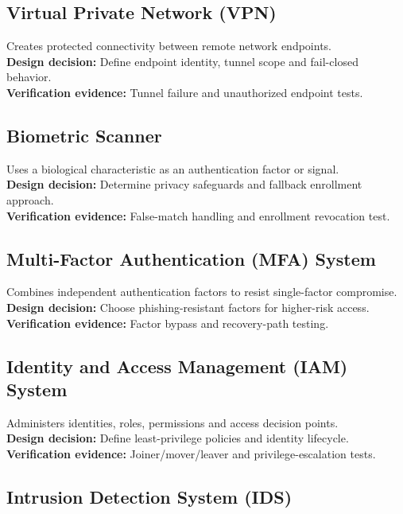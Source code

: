 \documentclass[10pt,letterpaper]{article}
\begin{document}
\subsection{Virtual Private Network (VPN)}
Creates protected connectivity between remote network endpoints.\\[4pt]
\textbf{Design decision:} Define endpoint identity, tunnel scope and fail-closed behavior.\\[3pt]
\textbf{Verification evidence:} Tunnel failure and unauthorized endpoint tests.\\[3pt]
\subsection{Biometric Scanner}
Uses a biological characteristic as an authentication factor or signal.\\[4pt]
\textbf{Design decision:} Determine privacy safeguards and fallback enrollment approach.\\[3pt]
\textbf{Verification evidence:} False-match handling and enrollment revocation test.\\[3pt]
\subsection{Multi-Factor Authentication (MFA) System}
Combines independent authentication factors to resist single-factor compromise.\\[4pt]
\textbf{Design decision:} Choose phishing-resistant factors for higher-risk access.\\[3pt]
\textbf{Verification evidence:} Factor bypass and recovery-path testing.\\[3pt]
\subsection{Identity and Access Management (IAM) System}
Administers identities, roles, permissions and access decision points.\\[4pt]
\textbf{Design decision:} Define least-privilege policies and identity lifecycle.\\[3pt]
\textbf{Verification evidence:} Joiner/mover/leaver and privilege-escalation tests.\\[3pt]
\subsection{Intrusion Detection System (IDS)}
\end{document}
